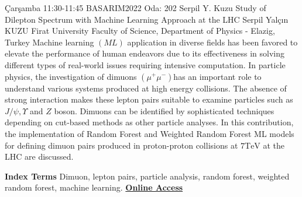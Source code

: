 
    \begin{abstract_basarim}
    {Çarşamba 11:30-11:45}
    {BASARIM2022}
    {Oda: 202}
    {Serpil Y. Kuzu}
    {Study of Dilepton Spectrum with Machine Learning Approach at the LHC}
    {%
    Serpil Yalçın KUZU}
    {%
    }
    {%
    Firat University Faculty of Science, Department of Physics - Elazig, Turkey}
    Machine learning $(M L)$ application in diverse fields has been favored to elevate the performance of human endeavors due to its effectiveness in solving different types of real-world issues requiring intensive computation. In particle physics, the investigation of dimuons $\left(\mu^{+} \mu^{-}\right)$has an important role to understand various systems produced at high energy collisions. The absence of strong interaction makes these lepton pairs suitable to examine particles such as $J / \psi, \Upsilon$ and $Z$ boson. Dimuons can be identified by sophisticated techniques depending on cut-based methods as other particle analyses. In this contribution, the implementation of Random Forest and Weighted Random Forest ML models for defining dimuon pairs produced in proton-proton collisions at $7 \mathrm{TeV}$ at the LHC are discussed. 
    
            \textbf{Index Terms} \newline{}Dimuon, lepton pairs, particle analysis, random forest, weighted random forest, machine learning.
     \newline\newline\noindent \href{https://drive.google.com/file/d/1VTPtlXJdSI560csxqGXvoE4-9Lptr3pA/view?usp=drivesdk}{\bfseries Online Access}
    \end{abstract_basarim}
    